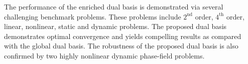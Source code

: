 The performance of the enriched \Bezier dual basis is demonstrated via several challenging benchmark problems. These problems include $2^\text{nd}$ order, $4^\text{th}$ order, linear, nonlinear, static and dynamic problems. The proposed dual basis demonstrates optimal convergence and yields compelling results as compared with the global dual basis. The robustness of the proposed dual basis is also confirmed by two highly nonlinear dynamic phase-field problems.\par

